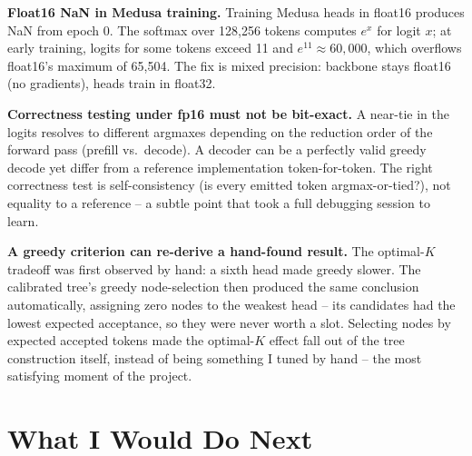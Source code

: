 \documentclass[12pt, a4paper]{article}
\begin{document}
\textbf{Float16 NaN in Medusa training.} Training Medusa heads in float16 produces
NaN from epoch 0. The softmax over 128,256 tokens computes $e^{x}$ for logit $x$;
at early training, logits for some tokens exceed 11 and $e^{11} \approx 60,000$,
which overflows float16's maximum of 65,504. The fix is mixed precision: backbone
stays float16 (no gradients), heads train in float32.

\textbf{Correctness testing under fp16 must not be bit-exact.} A near-tie in the
logits resolves to different argmaxes depending on the reduction order of the
forward pass (prefill vs.\ decode). A decoder can be a perfectly valid greedy decode
yet differ from a reference implementation token-for-token. The right correctness
test is self-consistency (is every emitted token argmax-or-tied?), not equality to a
reference -- a subtle point that took a full debugging session to learn.

\textbf{A greedy criterion can re-derive a hand-found result.} The optimal-$K$ tradeoff
was first observed by hand: a sixth head made greedy slower. The calibrated tree's
greedy node-selection then produced the same conclusion automatically, assigning zero
nodes to the weakest head -- its candidates had the lowest expected acceptance, so they
were never worth a slot. Selecting nodes by expected accepted tokens made the optimal-$K$
effect fall out of the tree construction itself, instead of being something I tuned by
hand -- the most satisfying moment of the project.

\section{What I Would Do Next}
\end{document}
